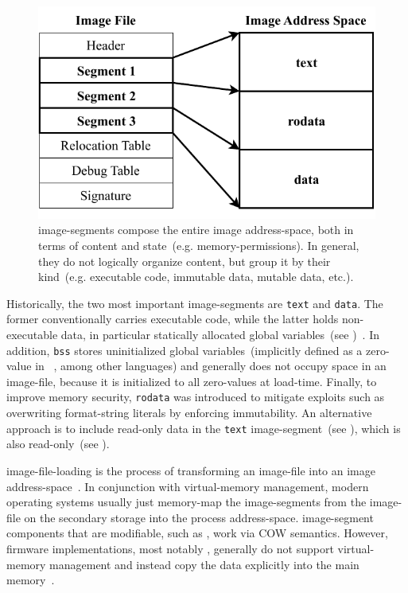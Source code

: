 \begin{figure}[htb]
  \centering
  \includegraphics{Figures/Segments.pdf}
  \caption{Image Segments.}
  \label{fig:img_segs}
  \caption*{\Glspl{image-segment} compose the entire \gls{image} \gls{address-space}, both in terms of content and state~(e.g. \gls{memory-permissions}). In general, they do not logically organize content, but group it by their kind~(e.g. executable code, immutable data, mutable data, etc.).}
\end{figure}

Historically, the two most important \glspl{image-segment} are \texttt{text} and \texttt{data}. The former conventionally carries executable code, while the latter holds non-executable data, in particular statically allocated global variables~(see )~\cite{elf-spec,macho-spec,levine2000linkers}. In addition, \texttt{bss} stores uninitialized global variables~(implicitly defined as a zero-value in ~\cite{ISO:2018:III}, among other languages) and generally does not occupy space in an \gls{image-file}, because it is initialized to all zero-values at load-time. Finally, to improve memory security, \texttt{rodata} was introduced to mitigate exploits such as overwriting \gls{format-string} literals by enforcing immutability. An alternative approach is to include read-only data in the \texttt{text} \gls{image-segment}~(see ), which is also read-only~(see ).

\Gls{image-file-loading} is the process of transforming an \gls{image-file} into an \gls{image} \gls{address-space}~\cite{levine2000linkers}. In conjunction with \gls{virtual-memory} management, modern operating systems usually just memory-map the \glspl{image-segment} from the \gls{image-file} on the secondary storage into the process \gls{address-space}. \Gls{image-segment} components that are modifiable, such as , work via \gls{COW} semantics. However, \gls{firmware} implementations, most notably , generally do not support \gls{virtual-memory} management and instead copy the data explicitly into the main memory~\cite{pi-spec,uefi-spec,edk2}.

